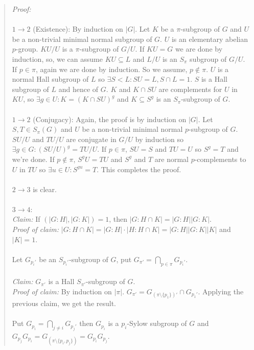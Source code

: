\begin{quote}
\emph{Proof:}  
\\
\\
$1 \rightarrow 2$ (Existence): 
By induction on $|G|$.  Let $K$ be a $\pi$-subgroup of $G$ and
$U$ be a non-trivial minimal normal subgroup of $G$.  $U$ is an elementary abelian
$p$-group.  $KU/U$ is a $\pi$-subgroup of $G/U$.  If $KU=G$ we are done by induction,
so, we can assume $KU \subseteq L$ and $L/U$ is an $S_{\pi}$ subgroup of $G/U$.
If $p \in \pi$, again we are done by induction.  So we assume, $p \notin \pi$.  $U$ is a
normal Hall subgroup of $L$ so $\exists S<L: SU=L, S \cap L = 1$.  $S$ is a Hall subgroup of
$L$ and hence of $G$.  $K$ and $K \cap SU$ are complements for $U$ in $KU$, so 
$\exists g \in U: K=(K \cap SU)^g$ and $K \subseteq S^g$ is an $S_{\pi}$-subgroup of $G$.
\\
\\
$1 \rightarrow 2$ (Conjugacy): 
Again, the proof is by induction on $|G|$.
Let $S, T \in S_{\pi}(G)$ and $U$ be a non-trivial minimal normal $p$-subgroup of $G$.
$SU/U$ and $TU/U$ are conjugate in $G/U$ by induction so $\exists g \in G: (SU/U)^g= TU/U$.
If $p \in \pi$, $SU=S$ and $TU=U$ so $S^g=T$ and we're done.
If $p \notin \pi$, $S^gU = TU$ and $S^g$ and $T$ are normal $p$-complements to $U$ in $TU$
so $\exists u \in U: S^{gu}= T$.  This completes the proof.
\\
\\
$2 \rightarrow 3$ is clear.
\\
\\
$3 \rightarrow 4$:\\
\emph{Claim:} If $(|G:H|,|G:K|)= 1$, then $|G: H \cap K|= |G:H| |G:K|$.
\\
\emph{Proof of claim:} 
$|G:H \cap K|= |G:H| \cdot |H: H \cap K| = |G:H| |G:K| |K|$ and $|K|=1$.
\\
\\
Let $G_{p_i'}$ be an $S_{p_i'}$-subgroup of $G$, put $G_{\pi'}= \bigcap_{p \in \pi} G_{p_i'}$.
\\
\\
\emph{Claim:} $G_{\pi'}$ is a Hall $S_{\pi'}$-subgroup of $G$.
\\
\emph{Proof of claim:} 
By induction on $|\pi|$.
$G_{\pi'}= G_{(\pi \setminus \{ p_1 \})'} \cap G_{p_1'}$.  Applying the previous claim, we get
the result.
\\
\\
Put $G_{p_i}= \bigcap_{j \ne i} G_{p_j'}$  then $G_{p_i}$ is a $p_i$-Sylow subgroup of $G$ and
$G_{p_j} G_{p_i}= G_{(\pi \setminus \{ p_i , p_j \})} = G_{p_i} G_{p_j}$.

\end{quote}
